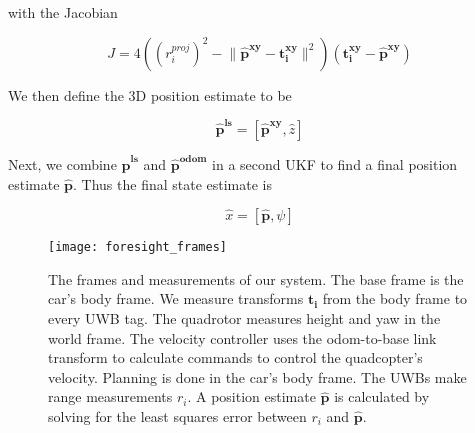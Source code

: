 with the Jacobian 

$$
    J = 4((r_i^{proj})^2 - \lVert \bm{\hat{p}^{xy}} - \bm{t_i^{xy}} \rVert^2)(\bm{t_i^{xy}} - \bm{\hat{p}^{xy}})
$$

We then define the 3D position estimate to be

$$
   \bm{\hat{p}^{ls}} = [\bm{\hat{p}^{xy}}, \hat{z}]
$$

Next, we combine $\bm{\hat{p}^{ls}}$ and $\bm{\hat{p}^{odom}}$ in a second UKF to find
a final position estimate $\bm{\hat{p}}$. Thus the final state estimate is

$$
   \hat{x} = [\bm{\hat{p}}, \psi]
$$


\begin{figure}[tb!]
  \centering
    \texttt{[image: foresight\_frames]}
  \caption{The frames and measurements of our system. The base frame
   is the car's body frame. We measure transforms $\bm{t_{i}}$ from the body
   frame to every UWB tag. The quadrotor measures height and yaw in the world
   frame. The velocity controller uses the odom-to-base\textunderscore 
   link transform to calculate commands to control the quadcopter's velocity.
   Planning is done in the car's body frame.
   The UWBs make range measurements $r_{i}$. A position estimate $\bm{\hat{p}}$
   is calculated by solving for the least squares error between $r_{i}$ and $\bm{\hat{p}}$.}
  \label{fig:frames}
\end{figure}







